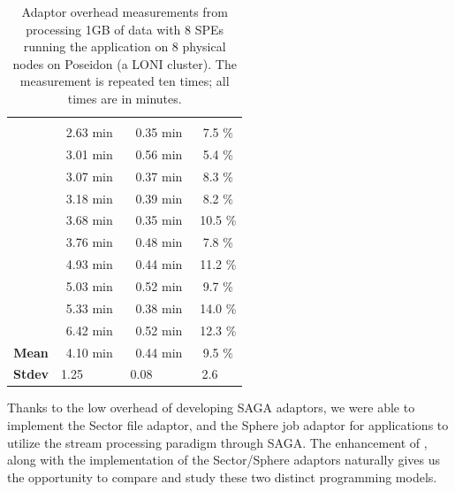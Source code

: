 \documentclass[3p,twocolumn]{elsarticle}
\begin{document}
\begin{table}[h!]
  \footnotesize
  \begin{tabular}{cccc}
    \hline         & \B{total}  & \B{abs. overhead} & \B{rel. overhead} \\
                   & 2.63 min   & 0.35 min            &   7.5  \%         \\
                   & 3.01 min   & 0.56 min            &   5.4  \%         \\
                   & 3.07 min   & 0.37 min            &   8.3  \%         \\
                   & 3.18 min   & 0.39 min            &   8.2  \%         \\
                   & 3.68 min   & 0.35 min            &  10.5  \%         \\
                   & 3.76 min   & 0.48 min            &   7.8  \%         \\
                   & 4.93 min   & 0.44 min            &  11.2  \%         \\
                   & 5.03 min   & 0.52 min            &   9.7  \%         \\
                   & 5.33 min   & 0.38 min            &  14.0  \%         \\
                   & 6.42 min   & 0.52 min            &  12.3  \%         \\
    \hline
    { {\bf Mean}}  & 4.10 min   & 0.44 min            &   9.5  \%         \\
    \hline
    { {\bf Stdev}} & 1.25 ~~~~~ & 0.08 ~~~~~          &   2.6 ~~          \\
    \hline \hline
  \end{tabular}
  \caption{Adaptor overhead measurements from processing 1GB of data with 8
  SPEs running the \wc application on 8 physical nodes on Poseidon (a
  LONI cluster). The measurement is repeated ten times; all times are in minutes.
  \label{tab:sphere_overhead}}
\end{table}


Thanks to the low overhead of developing SAGA adaptors, we were able
to implement the Sector file adaptor, and the Sphere job adaptor for
applications to utilize the stream processing paradigm through SAGA.
The enhancement of \sagamapreduce, along with the implementation of the
Sector/Sphere adaptors naturally gives us the opportunity to compare
and study these two distinct programming models.
\end{document}
